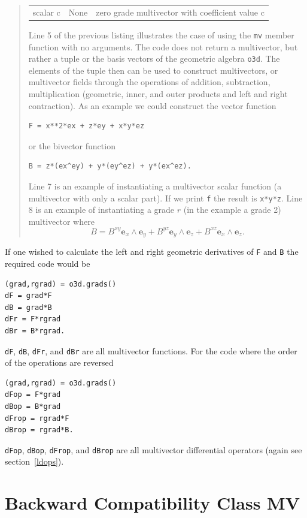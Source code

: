 \documentclass[12pt]{report}
\newcommand{\bm}[1]{\boldsymbol{#1}}
\newcommand{\W}{\wedge}
\newcommand{\T}[1]{\texttt{#1}}
\begin{document}
\begin{quote}
\begin{center}
\begin{tabular}{ccc}
         scalar c & None  &  zero grade multivector with coefficient value c
    \end{tabular}
\end{center}
Line 5 of the previous listing illustrates the case of using the \T{mv} member function with
no arguments. The code does not return a multivector, but rather a tuple or the basis vectors of the geometric algebra \T{o3d}.
The elements of the tuple then can
be used to construct multivectors, or multivector fields through the operations
of addition, subtraction, multiplication (geometric, inner, and outer products and left and right contraction).
As an example we could construct the vector function
\begin{lstlisting}[numbers=none]
F = x**2*ex + z*ey + x*y*ez
\end{lstlisting}
\vspace{-12pt}or the bivector function
\begin{lstlisting}[numbers=none]
B = z*(ex^ey) + y*(ey^ez) + y*(ex^ez).
\end{lstlisting}
\vspace{-7pt}Line 7 is an example of instantiating a multivector scalar function (a multivector with only a scalar part). If
we print \T{f} the result is \T{x*y*z}.  Line 8 is an example of instantiating a grade $r$ (in the example a grade 2) multivector
where
\begin{equation}
    B = B^{xy}\bm{e}_{x}\W\bm{e}_{y}+B^{yz}\bm{e}_{y}\W\bm{e}_{z}+B^{xz}\bm{e}_{x}\W\bm{e}_{z}.
\end{equation}
\end{quote}
If one wished to calculate the left and right geometric derivatives of \T{F} and \T{B} the required code would be
\begin{lstlisting}
(grad,rgrad) = o3d.grads()
dF = grad*F
dB = grad*B
dFr = F*rgrad
dBr = B*rgrad.
\end{lstlisting}
\T{dF}, \T{dB}, \T{dFr}, and \T{dBr} are all multivector functions. For the code where the order of the operations are
reversed
\begin{lstlisting}
(grad,rgrad) = o3d.grads()
dFop = F*grad
dBop = B*grad
dFrop = rgrad*F
dBrop = rgrad*B.
\end{lstlisting}
\T{dFop}, \T{dBop}, \T{dFrop}, and \T{dBrop} are all multivector differential operators (again see section~\ref{ldops}).

\section{Backward Compatibility Class MV}
\end{document}
